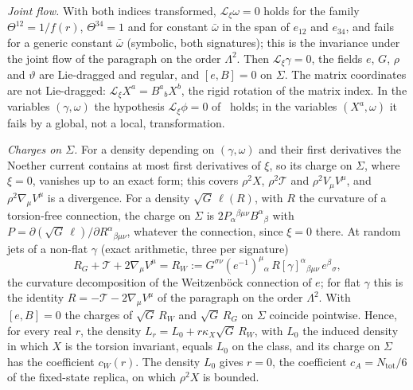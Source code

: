 \emph{Joint flow.} With both indices transformed, \(\mathcal L_\xi\omega=0\) holds for the family \(\Theta^{12}=1/f(r)\), \(\Theta^{34}=1\) and for constant \(\bar\omega\) in the span of \(e_{12}\) and \(e_{34}\), and fails for a generic constant \(\bar\omega\) (symbolic, both signatures); this is the invariance under the joint flow of the paragraph on the order \(\Lambda^2\). Then \(\mathcal L_\xi\gamma=0\), the fields \(e\), \(G\), \(\rho\) and \(\vartheta\) are Lie-dragged and regular, and \([e,B]=0\) on \(\Sigma\). The matrix coordinates are not Lie-dragged: \(\mathcal L_\xi X^a=B^a{}_bX^b\), the rigid rotation of the matrix index. In the variables \((\gamma,\omega)\) the hypothesis \(\mathcal L_\xi\phi=0\) of~\cite{IyerWald1994} holds; in the variables \((X^a,\omega)\) it fails by a global, not a local, transformation.

\emph{Charges on \(\Sigma\).} For a density depending on \((\gamma,\omega)\) and their first derivatives the Noether current contains at most first derivatives of \(\xi\), so its charge on \(\Sigma\), where \(\xi=0\), vanishes up to an exact form; this covers \(\rho^2X\), \(\rho^2\mathcal T\) and \(\rho^2V_\mu V^\mu\), and \(\rho^2\nabla_\mu V^\mu\) is a divergence. For a density \(\sqrt G\,\ell(R)\), with \(R\) the curvature of a torsion-free connection, the charge on \(\Sigma\) is \(2P_\alpha{}^{\beta\mu\nu}B^\alpha{}_\beta\) with \(P=\partial(\sqrt G\,\ell)/\partial R^\alpha{}_{\beta\mu\nu}\), whatever the connection, since \(\xi=0\) there. At random jets of a non-flat \(\gamma\) (exact arithmetic, three per signature)
\[
  R_G+\mathcal T+2\nabla_\mu V^\mu=R_W:=G^{\sigma\nu}(e^{-1})^\mu{}_\alpha\,R[\gamma]^\alpha{}_{\beta\mu\nu}\,e^\beta{}_\sigma ,
\]
the curvature decomposition of the Weitzenb\"ock connection of \(e\); for flat \(\gamma\) this is the identity \(R=-\mathcal T-2\nabla_\mu V^\mu\) of the paragraph on the order \(\Lambda^2\). With \([e,B]=0\) the charges of \(\sqrt G\,R_W\) and \(\sqrt G\,R_G\) on \(\Sigma\) coincide pointwise. Hence, for every real \(r\), the density \(L_r=L_0+r\kappa_X\sqrt G\,R_W\), with \(L_0\) the induced density in which \(X\) is the torsion invariant, equals \(L_0\) on the class, and its charge on \(\Sigma\) has the coefficient \(c_W(r)\). The density \(L_0\) gives \(r=0\), the coefficient \(c_A=N_{\mathrm{tot}}/6\) of the fixed-state replica, on which \(\rho^2X\) is bounded.

